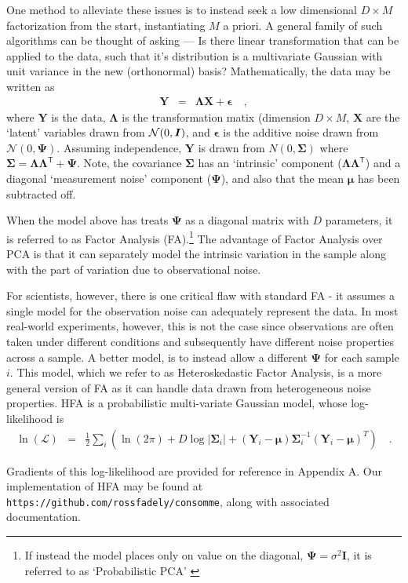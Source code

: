 \documentclass[12pt,preprint]{aastex}
\newcommand{\transpose}[1]{{#1}^{\!{\mathsf{T}}}}
\newcommand{\N}{\mathcal{N}}
\newcommand{\mbf}[1]{\boldsymbol{#1}}
\newcommand{\X}{\mbf{X}}
\newcommand{\Y}{\mbf{Y}}
\newcommand{\I}{\mbf{I}}
\newcommand{\eps}{\mbf{\epsilon}}
\newcommand{\ps}{\mbf{\Psi}}
\newcommand{\m}{\mbf{\mu}}
\newcommand{\lam}{\mbf{\Lambda}}
\newcommand{\sig}{\mbf{\Sigma}}
\begin{document}
One method to alleviate these issues is to instead seek a low dimensional 
$D \times M$ factorization from the start, instantiating $M$ a priori.  A general family 
of such algorithms can be thought of asking --- Is there linear transformation 
that can be applied to the data, such that it's distribution is a multivariate 
Gaussian with unit variance in the new (orthonormal) basis? Mathematically, 
the data may be written as 
\begin{eqnarray}
\Y &=& \lam \X + \eps
\quad,
\label{eq:lowrank}
\end{eqnarray}
where $\Y$ is the data, $\lam$ is the transformation matix (dimension $D \times 
M$, $\X$ are the `latent' variables drawn from $\N(0,{\rm \I})$, and $\eps$
is the additive noise drawn from $\N(0,\ps)$.  Assuming
independence, $\Y$ is drawn from $N(0,\sig)$ where $\sig = \lam \transpose{\lam} + \ps$.
Note, the covariance $\sig$ has an `intrinsic' component ($\lam \transpose{\lam}$) 
and a diagonal `measurement noise' component ($\ps$), and also that the mean $\m$ 
has been subtracted off. 

When the model above has treats $\ps$ as a diagonal matrix with $D$ parameters, 
it is referred to as Factor Analysis (FA).\footnote{If instead the model places only on value 
on the diagonal, $\ps = \sigma^2\I$, it is referred to as `Probabilistic PCA' 
\citep{roweis98}}  The advantage of Factor Analysis over PCA is that it can separately 
model the intrinsic variation in the sample along with the part of variation due to 
observational noise.  

For scientists, however, there is one critical flaw with standard 
FA - it assumes a single model for the observation noise can adequately represent the 
data.  In most real-world experiments, however, this is not the case since observations 
are often taken under different conditions and subsequently have different noise 
properties across a sample.  A better model, is to instead allow a different $\ps$ for 
each sample $i$.  This model, which we refer to as Heteroskedastic Factor Analysis, 
is a more general version of FA as it can handle data drawn from heterogeneous noise 
properties.  HFA is a probabilistic multi-variate Gaussian model, whose log-likelihood is 
\begin{eqnarray}
\ln(\mathcal{L}) &=& \frac{1}{2} \sum_i \left(\ln(2\pi) + D\log|\sig_i| + (\Y_i-\m)\sig_i^{-1}(\Y_i-\m)^T\right)
\quad.
\label{eq:lowrank}
\end{eqnarray}

\noindent Gradients of this log-likelihood are provided for reference in Appendix A.  
Our implementation of HFA may be found at \texttt{https://github.com/rossfadely/consomme}, 
along with associated documentation.
\end{document}
